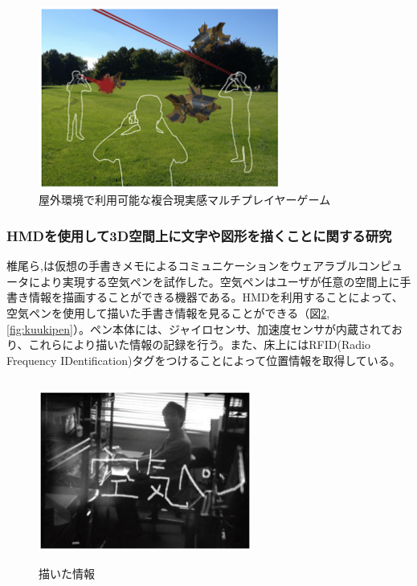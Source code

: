 \documentclass[11pt,a4j, titlepage]{jarticle} %
\begin{document}
\begin{figure}[H]
  \begin{center}
    \includegraphics[clip,height=6.0cm,width=8.0cm]{./augmented_invaders.eps}
    \caption{屋外環境で利用可能な複合現実感マルチプレイヤーゲーム}
    \label{fig:augmented_invaders}
  \end{center}
\end{figure}

\subsubsection{HMDを使用して3D空間上に文字や図形を描くことに関する研究}
椎尾ら\cite{siio},\cite{siio2}は仮想の手書きメモによるコミュニケーションをウェアラブルコンピュータにより実現する空気ペンを試作した。空気ペンはユーザが任意の空間上に手書き情報を描画することができる機器である。HMDを利用することによって、空気ペンを使用して描いた手書き情報を見ることができる（図\ref{fig:tegakijouhou}, \ref{fig:kuukipen}）。ペン本体には、ジャイロセンサ、加速度センサが内蔵されており、これらにより描いた情報の記録を行う。また、床上にはRFID(Radio Frequency IDentification)タグをつけることによって位置情報を取得している。

\begin{figure}[H]
  \begin{center}
    \includegraphics[clip,height=6.0cm,width=7.0cm]{./tegakijouhou.eps}
    \caption{描いた情報}
    \label{fig:tegakijouhou}
  \end{center}
\end{figure}
\end{document}
